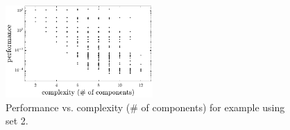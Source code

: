 \begin{figure}
\centering
\includegraphics[width=0.5\textwidth]{../ch6/figures/reduced/r_template1_lib5_CR_RESULTS_SET2}
\caption[Performance vs. complexity for  example using set 2.]{Performance vs. complexity (\# of components) for  example using set 2.\label{fig:mm1_results_set2}}
\end{figure}